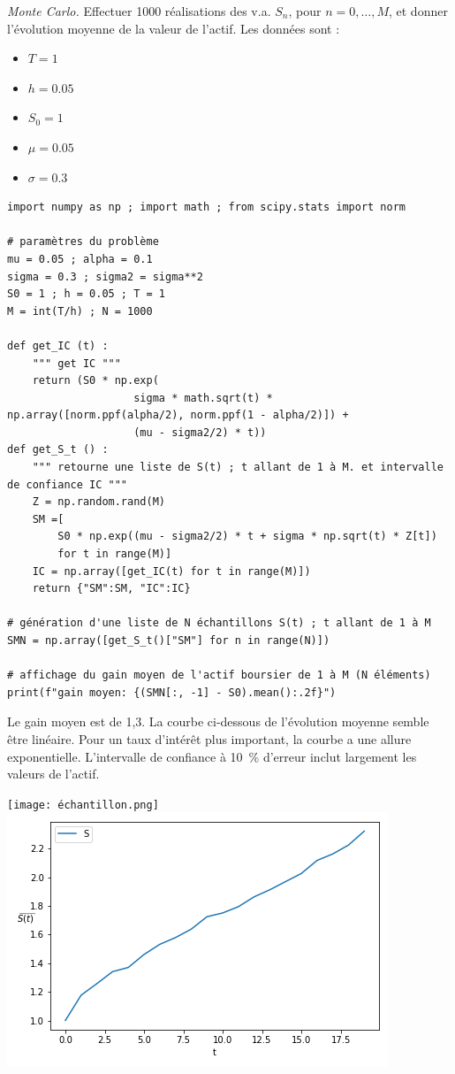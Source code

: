 \documentclass[answers, 10pt]{exam}
\begin{document}
\begin{questions}
	\question
	
	\textit{Monte Carlo.} Effectuer 1000 réalisations des v.a. $S_n$, pour
	$n=0,\dots,M$, et donner l'évolution moyenne de la valeur de l'actif.
	Les données sont : 
	
	\begin{itemize}
		\item $T=1$
		\item $h = 0.05$
		\item $S_0 = 1$
		\item $\mu = 0.05$
		\item $ \sigma = 0.3$
	\end{itemize}

	\begin{solutionorbox}
	\begin{verbatim}
import numpy as np ; import math ; from scipy.stats import norm

# paramètres du problème
mu = 0.05 ; alpha = 0.1
sigma = 0.3 ; sigma2 = sigma**2
S0 = 1 ; h = 0.05 ; T = 1
M = int(T/h) ; N = 1000

def get_IC (t) :
    """ get IC """    
    return (S0 * np.exp(
                    sigma * math.sqrt(t) * np.array([norm.ppf(alpha/2), norm.ppf(1 - alpha/2)]) + 
                    (mu - sigma2/2) * t))
def get_S_t () :
    """ retourne une liste de S(t) ; t allant de 1 à M. et intervalle de confiance IC """
    Z = np.random.rand(M)
    SM =[
        S0 * np.exp((mu - sigma2/2) * t + sigma * np.sqrt(t) * Z[t])
        for t in range(M)]
    IC = np.array([get_IC(t) for t in range(M)])
    return {"SM":SM, "IC":IC}

# génération d'une liste de N échantillons S(t) ; t allant de 1 à M
SMN = np.array([get_S_t()["SM"] for n in range(N)])

# affichage du gain moyen de l'actif boursier de 1 à M (N éléments)
print(f"gain moyen: {(SMN[:, -1] - S0).mean():.2f}")

\end{verbatim}
		
Le gain  moyen est de 1,3. La courbe ci-dessous de l'évolution moyenne semble être linéaire. Pour un taux d'intérêt plus important, la courbe a une allure exponentielle. L'intervalle de confiance à 10 \% d'erreur inclut largement les valeurs de l'actif.

\texttt{[image: échantillon.png]}
\includegraphics[width=0.45\linewidth]{moyenne.png}

\end{solutionorbox}
\end{questions}
\end{document}
